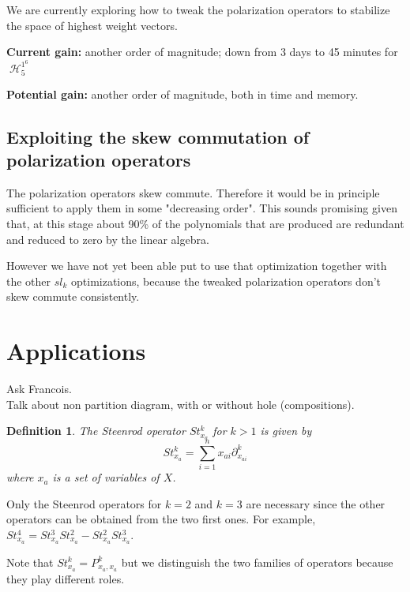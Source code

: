 \documentclass[letter,12pt]{article}
\newcommand{\pauline}[1]{\todo[linecolor=blue,backgroundcolor=blue!25,bordercolor=blue]{#1}}
\DeclareMathOperator{\harmonics}{\mathcal{H}}
\newtheorem{definition}{Definition}
\begin{document}
	We are currently exploring how to tweak the polarization operators to stabilize the space of highest weight vectors.
	
	\textbf{Current gain:} another order of magnitude; down from 3 days to 45 minutes for $\harmonics_5^{1^6}$
	
	\textbf{Potential gain:} another order of magnitude, both in time and memory.
	
	\subsection{Exploiting the skew commutation of polarization operators}
	
	The polarization operators skew commute. Therefore it would be in principle sufficient to apply them in some "decreasing order". This sounds promising given that, at this stage about 90\% of the polynomials that are produced are redundant and reduced to zero by the linear algebra.
	
	However we have not yet been able put to use that optimization together with the other $sl_k$ optimizations, because the tweaked polarization operators don't skew commute consistently.
	
	\section{Applications}
	Ask Francois.\\
	Talk about non partition diagram, with or without hole (compositions). 
	
	\begin{definition} \pauline{Steenrod operators? }
		The \emph{Steenrod operator} $St_{x_a}^k$ for $k>1$ is given by
		$$St_{x_a}^k = \sum_{i=1}^{n} x_{ai} \partial_{x_{ai}}^k$$
		where $x_a$ is a set of variables of $X$. 
	\end{definition}
	
	
	Only the Steenrod operators for $k=2$ and $k=3$ are necessary since the other operators can be obtained from the two first ones. For example, $St_{x_a}^4 = St_{x_a}^3St_{x_a}^2 - St_{x_a}^2St_{x_a}^3$. 
	
	Note that $St_{x_a}^k = P_{x_a,x_a}^k$ but we distinguish the two families of operators because they play different roles. 
	
	

\nocite{*}

\end{document}
